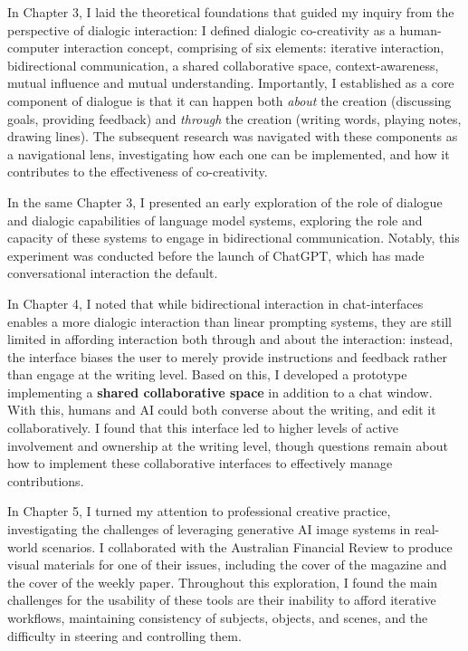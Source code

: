 In Chapter 3, I laid the theoretical foundations that guided my inquiry from the perspective of dialogic interaction: I defined dialogic co-creativity as a human-computer interaction concept, comprising of six elements: iterative interaction, bidirectional communication, a shared collaborative space, context-awareness, mutual influence and mutual understanding. Importantly, I established as a core component of dialogue is that it can happen both \textit{about} the creation (discussing goals, providing feedback) and \textit{through} the creation (writing words, playing notes, drawing lines). The subsequent research was navigated with these components as a navigational lens, investigating how each one can be implemented, and how it contributes to the effectiveness of co-creativity.

In the same Chapter 3, I presented an early exploration of the role of dialogue and dialogic capabilities of language model systems, exploring the role and capacity of these systems to engage in bidirectional communication. Notably, this experiment was conducted before the launch of ChatGPT, which has made conversational interaction the default.

In Chapter 4, I noted that while bidirectional interaction in chat-interfaces enables a more dialogic interaction than linear prompting systems, they are still limited in affording interaction both through and about the interaction: instead, the interface biases the user to merely provide instructions and feedback rather than engage at the writing level. Based on this, I developed a prototype implementing a \textbf{shared collaborative space} in addition to a chat window. With this, humans and AI could both converse about the writing, and edit it collaboratively. I found that this interface led to higher levels of active involvement and ownership at the writing level, though questions remain about how to implement these collaborative interfaces to effectively manage contributions.

In Chapter 5, I turned my attention to professional creative practice, investigating the challenges of leveraging generative AI image systems in real-world scenarios. I collaborated with the Australian Financial Review to produce visual materials for one of their issues, including the cover of the magazine and the cover of the weekly paper. Throughout this exploration, I found the main challenges for the usability of these tools are their inability to afford iterative workflows, maintaining consistency of subjects, objects, and scenes, and the difficulty in steering and controlling them.

